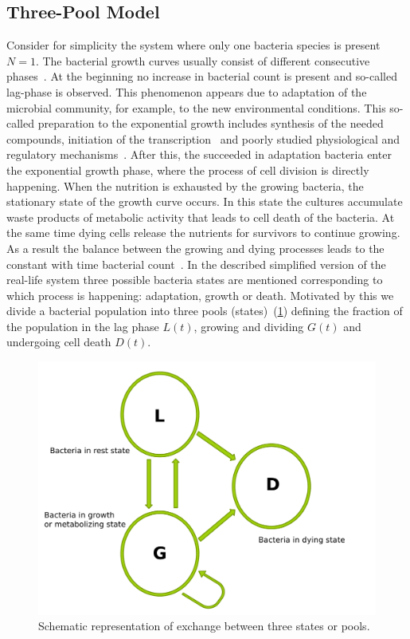 \documentclass[10pt,A4paper]{article}
\numberwithin{equation}{section}
\begin{document}
\subsection{Three-Pool Model}
Consider for simplicity the system where only one bacteria species is present $N=1$.
The bacterial growth curves usually consist of different consecutive phases~\cite{buchanan_when_1997}.
At the beginning no increase in bacterial count is present and so-called lag-phase is observed.
This phenomenon appears due to adaptation of the microbial community, for example, to the new environmental conditions.
This so-called preparation to the exponential growth includes synthesis of the needed compounds, initiation of the transcription~\cite{rolfe_lag_2012} and poorly studied physiological and regulatory mechanisms~\cite{monod_growth_1949}.
After this, the succeeded in adaptation bacteria enter the exponential growth phase, where the process of cell division is directly happening.
When the nutrition is exhausted by the growing bacteria, the stationary state of the growth curve occurs.
In this state the cultures accumulate waste products of metabolic activity that leads to cell death of the bacteria.
At the same time dying cells release the nutrients for survivors to continue growing.
As a result the balance between the growing and dying processes leads to the constant with time bacterial count~\cite{navarro_llorens_stationary_2010}.
In the described simplified version of the real-life system three possible bacteria states are mentioned corresponding to which process is happening: adaptation, growth or death.
Motivated by this we divide a bacterial population into three pools (states)~(\ref{fig:SchematicRep}) defining the fraction of the population in the lag phase $L(t)$, growing and dividing $G(t)$ and undergoing cell death $D(t)$.
\begin{figure}[t]
    \begin{center}
    \includegraphics[width=0.9\columnwidth]{Figures/TPM_fig.pdf}
    \caption{Schematic representation of exchange between three states or pools.}
    \label{fig:SchematicRep}
    \end{center}
\end{figure}
\end{document}
